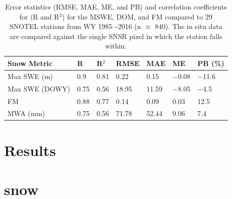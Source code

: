 \begin{table}[htbp]
  \centering
  \caption{Error statistics (RMSE, MAE, ME, and PB) and correlation coefficients for (R and R$^{2}$) for the MSWE, DOM, and FM compared to 29 SNOTEL stations from WY 1985–-2016 (n $\approx$ 840). The in situ data are compared against the single SNSR pixel in which the station falls within.}
  \label{tab:snow_metrics_val_table}
  \begin{tabular}{lllllll}
    \toprule
    Snow Metric & R & R$^{2}$ & RMSE & MAE & ME & PB (\%) \\
    \midrule
    Max SWE (m) & 0.9 & 0.81 & 0.22 & 0.15 & $-$0.08 & $-$11.6 \\
    Max SWE (DOWY) & 0.75 & 0.56 & 18.95 & 11.59 & $-$8.05 & $-$4.5 \\
    FM & 0.88 & 0.77 & 0.14 & 0.09 & 0.03 & 12.5 \\
    MWA (mm) & 0.75 & 0.56 & 71.78 & 52.44 & 9.06 & 7.4 \\
    \bottomrule
  \end{tabular}
\end{table}

\hypertarget{ch2-results}{\section{Results}\label{ch2-results}}
\hypertarget{ch2-results-1}{\section{snow}\label{ch2-results-1}}

